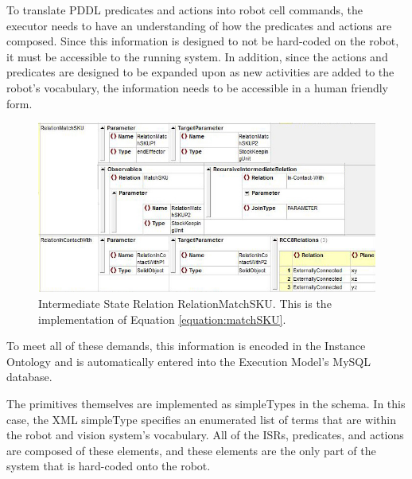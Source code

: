 To translate PDDL predicates and actions into robot cell commands, 
the executor needs to have an
understanding of how the predicates and actions are composed. Since this information is
designed to not be hard-coded on the robot, it must be accessible to the running system.
In addition, since the actions and predicates are designed to be expanded upon as
new activities are added to the robot's vocabulary, the information needs to be
accessible in a human friendly form.
%
\begin{figure}[htb!]
\begin{center}
\includegraphics[width=12cm]{images/MatchSKU_ISR.jpg}
\caption{Intermediate State Relation RelationMatchSKU. This is the
implementation of Equation \ref{equation:matchSKU}.}
\label{fig:ISR}
\end{center}
\end{figure}
%
To meet all of these demands, this information is encoded in the Instance Ontology and is automatically entered into the Execution Model's MySQL database. 

The primitives themselves are implemented as simpleTypes in the schema.
In this case, the XML simpleType specifies an enumerated list of terms
that are within the robot and vision system's vocabulary. All of the
ISRs, predicates, and actions are composed of these elements, and these
elements are the only part of the system that is hard-coded onto the
robot.
